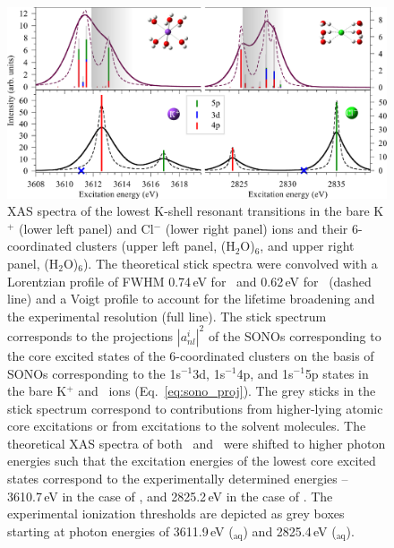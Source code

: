 \begin{figure}[h!]
\centering
\includegraphics[scale=0.8]{figures/xas_spectra.eps}
\caption{XAS spectra of the lowest K-shell resonant transitions in the bare K$^{+}$ (lower left panel) and Cl$^{-}$ (lower right panel) ions and their 6-coordinated clusters (upper left panel, \ki(H$_2$O)$_6$, and upper right panel, \cli(H$_2$O)$_6$). The theoretical stick spectra were convolved with a Lorentzian profile of FWHM 0.74\,eV for \ki~and 0.62\,eV for \cli~(dashed line)\citep{ceolin17:263003} and a Voigt profile to account for the lifetime broadening and the experimental resolution (full line). The stick spectrum corresponds to the projections $|a_{nl}^{i}|^2$ of the SONOs corresponding to the core excited states of the 6-coordinated clusters on the basis of SONOs corresponding to the 1s$^{-1}$3d, 1s$^{-1}$4p, and 1s$^{-1}$5p states in the bare K$^+$ and \cli~ions (Eq.\ \ref{eq:sono_proj}). The grey sticks in the stick spectrum correspond to contributions from higher-lying atomic core excitations or from excitations to the solvent molecules. The theoretical XAS spectra of both \ki~and \cli~were shifted to higher photon energies such that the excitation energies of the lowest core excited states correspond to the experimentally determined energies -- 3610.7\,eV in the case of \ki, and 2825.2\,eV in the case of \cli. The experimental ionization thresholds are depicted as grey boxes starting at photon energies of 3611.9\,eV (\ki$_{\text{aq}}$) and 2825.4\,eV (\cli$_{\text{aq}}$).}
\label{fg:xas_kcl}
\end{figure}


